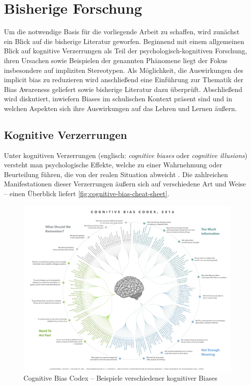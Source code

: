 \chapter{Bisherige Forschung}

Um die notwendige Basis für die vorliegende Arbeit zu schaffen, wird zunächst ein Blick auf die bisherige Literatur geworfen.
Beginnend mit einem allgemeinen Blick auf kognitive Verzerrungen als Teil der psychologisch-kognitiven Forschung, ihren Ursachen sowie Beispielen der genannten Phänomene liegt der Fokus insbesondere auf impliziten Stereotypen.
Als Möglichkeit, die Auswirkungen des implicit bias zu reduzieren wird anschließend eine Einführung zur Thematik der Bias Awareness geliefert sowie bisherige Literatur dazu überprüft.
Abschließend wird diskutiert, inwiefern Biases im schulischen Kontext präsent sind und in welchen Aspekten sich ihre Auswirkungen auf das Lehren und Lernen äußern.


\section{Kognitive Verzerrungen}
\label{sec:kognitive-verzerrungen}

Unter kognitiven Verzerrungen (englisch: \emph{cognitive biases} oder \emph{cognitive illusions}) versteht man psychologische Effekte, welche zu einer Wahrnehmung oder Beurteilung führen, die von der realen Situation abweicht \citep{pohl2004cognitive}.
Die zahlreichen Manifestationen dieser Verzerrungen äußern sich auf verschiedene Art und Weise -- einen Überblick liefert \autoref{fig:cognitive-bias-cheat-sheet}.

\begin{figure}[h!]
	\centering
	\includegraphics[width=\textwidth]{resources/cognitive-bias-cheat-sheet.png}
	\caption{Cognitive Bias Codex -- Beispiele verschiedener kognitiver Biases \citep{benson2016cognitive}}
	\label{fig:cognitive-bias-cheat-sheet}
\end{figure}

